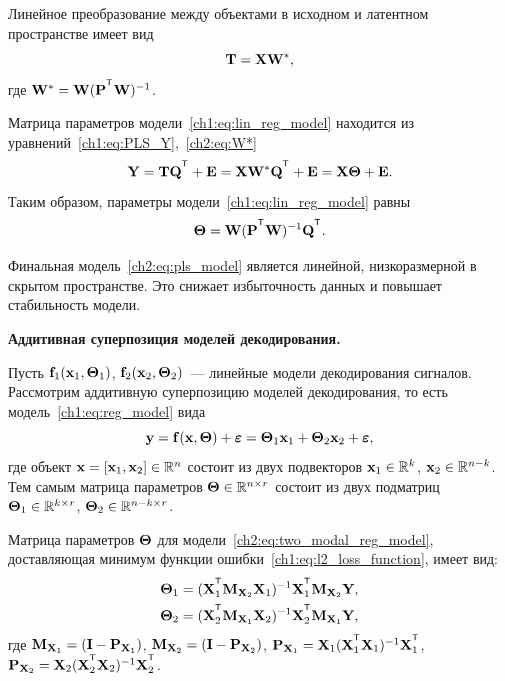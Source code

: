 \documentclass[11pt, a5paper]{dissert}
\begin{document}
Линейное преобразование между объектами в исходном и латентном пространстве имеет вид
\begin{equation}
	\mathbf{T} = \mathbf{X} \mathbf{W}^*,
	\label{ch2:eq:W*}
\end{equation}
где $\bW^* = \bW (\bP^{\T} \bW)^{-1}$. 

Матрица параметров модели~\ref{ch1:eq:lin_reg_model} находится из уравнений~\eqref{ch1:eq:PLS_Y},~\eqref{ch2:eq:W*}
\begin{equation}
	\bY = \bT \bQ^{\T} + \bE = \bX \bW^* \bQ^{\T} + \bE = \bX \bTheta + \bE.
	\label{ch2:eq:pls_model}
\end{equation}
Таким образом, параметры модели~\eqref{ch1:eq:lin_reg_model} равны
\begin{equation*}
	\bTheta = \bW (\bP^{\T} \bW)^{-1} \bQ^{\T}.
\end{equation*}

Финальная модель~\eqref{ch2:eq:pls_model} является линейной, низкоразмерной в скрытом пространстве. 
Это снижает избыточность данных и повышает стабильность модели.

\textbf{Аддитивная суперпозиция моделей декодирования.}
\label{sec:ch2:superposition}

Пусть $\mathbf{f}_1(\mathbf{x}_1, \boldsymbol{\Theta}_1)$, $\mathbf{f}_2(\mathbf{x}_2, \boldsymbol{\Theta}_2)$~--- линейные модели декодирования сигналов. 
Рассмотрим аддитивную суперпозицию моделей декодирования, то есть модель~\eqref{ch1:eq:reg_model} вида
\begin{equation}
	\mathbf{y} = \mathbf{f}(\mathbf{x}, \boldsymbol{\Theta}) + \boldsymbol{\varepsilon} = \boldsymbol{\Theta}_1 \mathbf{x}_1 + \boldsymbol{\Theta}_2 \mathbf{x}_2 + \boldsymbol{\varepsilon},
	\label{ch2:eq:two_modal_reg_model}
\end{equation}
где объект $\mathbf{x} = [\mathbf{x}_1, \mathbf{x}_2] \in \mathbb{R}^n$ состоит из двух подвекторов $\mathbf{x}_1 \in \mathbb{R}^k$, $\mathbf{x}_2 \in \mathbb{R}^{n - k}$. Тем самым матрица параметров $\boldsymbol{\Theta} \in \mathbb{R}^{n \times r}$ состоит из двух подматриц $\boldsymbol{\Theta}_1 \in \mathbb{R}^{k \times r}$, $\boldsymbol{\Theta}_2 \in \mathbb{R}^{n - k \times r}$. 

\begin{statement}
	\label{ch2:stat:two_modal_params}
	Матрица параметров $\boldsymbol{\Theta}$ для модели~\eqref{ch2:eq:two_modal_reg_model}, доставляющая минимум функции ошибки~\eqref{ch1:eq:l2_loss_function}, имеет вид:
	\begin{align*}
		\bTheta_1 &= (\bX_1^{\T} \bM_{\bX_2} \bX_1)^{-1} \bX_1^{\T} \bM_{\bX_2} \bY, \\
		\bTheta_2 &= (\bX_2^{\T} \bM_{\bX_1} \bX_2)^{-1} \bX_2^{\T} \bM_{\bX_1} \bY,
	\end{align*}
	где $\mathbf{M}_{\mathbf{X}_1} = (\mathbf{I} - \mathbf{P}_{\mathbf{X}_1})$, $\mathbf{M}_{\mathbf{X}_2} = (\mathbf{I} - \mathbf{P}_{\mathbf{X}_2})$, $\bP_{\bX_1} = \bX_1 (\bX_1^{\T} \bX_1)^{-1} \bX_1^{\T}$, $\bP_{\bX_2} = \bX_2 (\bX_2^{\T} \bX_2)^{-1} \bX_2^{\T}$.
\end{statement}
\end{document}
